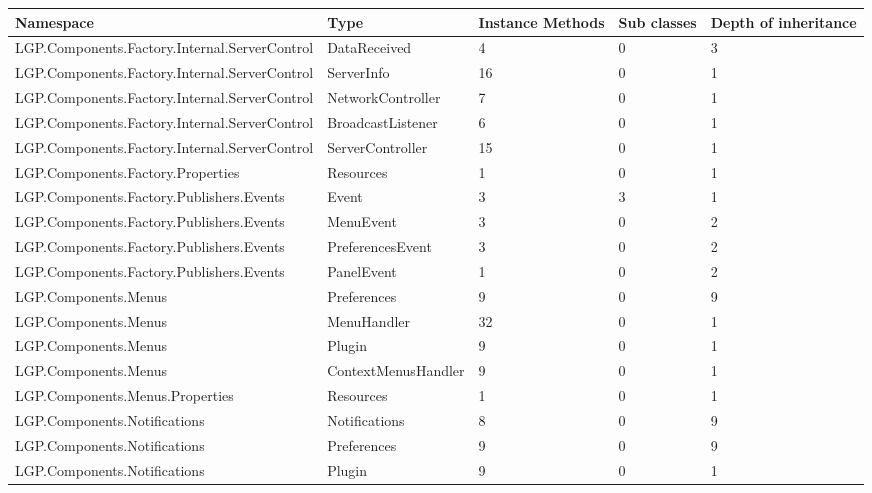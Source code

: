 			\begin{table}[h!t]
				\footnotesize{\begin{tabular}{ | p{70mm} | p{33mm} | p{10mm} | p{10mm} | p{10mm}  | }	
																								\hline
				Namespace & Type  & Instance Methods & Sub classes & Depth of inheritance  \\ \hline				
				LGP.Components.Factory.Internal.ServerControl & DataReceived & 4     & 0     & 3  \\ \hline
				LGP.Components.Factory.Internal.ServerControl & ServerInfo & \cellcolor{ored}16    & 0     & 1  \\ \hline
				LGP.Components.Factory.Internal.ServerControl & NetworkController & 7     & 0     & 1  \\ \hline
				LGP.Components.Factory.Internal.ServerControl & BroadcastListener & 6     & 0     & 1  \\ \hline
				LGP.Components.Factory.Internal.ServerControl & ServerController & 15    & 0     & 1  \\ \hline
				LGP.Components.Factory.Properties & Resources & 1     & 0     & 1  \\ \hline
				LGP.Components.Factory.Publishers.Events & Event & 3     & \cellcolor{ored} 3     & 1  \\ \hline
				LGP.Components.Factory.Publishers.Events & MenuEvent & 3     & 0     & 2  \\ \hline
				LGP.Components.Factory.Publishers.Events & PreferencesEvent & 3     & 0     & 2  \\ \hline
				LGP.Components.Factory.Publishers.Events & PanelEvent & 1     & 0     & 2  \\ \hline
				LGP.Components.Menus & Preferences & 9     & 0     & 9  \\ \hline
				LGP.Components.Menus & MenuHandler & \cellcolor{ored}32    & 0     & 1  \\ \hline
				LGP.Components.Menus & Plugin & 9     & 0     & 1  \\ \hline
				LGP.Components.Menus & ContextMenusHandler & 9     & 0     & 1  \\ \hline
				LGP.Components.Menus.Properties & Resources & 1     & 0     & 1  \\ \hline
				LGP.Components.Notifications & Notifications & 8     & 0     & 9  \\ \hline
				LGP.Components.Notifications & Preferences & 9     & 0     & 9  \\ \hline
				LGP.Components.Notifications & Plugin & 9     & 0     & 1  \\ \hline

\end{tabular}}
\end{table}
